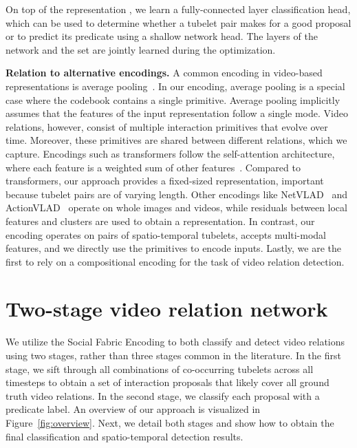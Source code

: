 \documentclass[10pt,twocolumn,letterpaper]{article}
\begin{document}
On top of the representation , we learn a fully-connected layer classification head, which can be used to determine whether a tubelet pair makes for a good proposal or to predict its predicate using a shallow network head. The layers of the network and the set  are jointly learned during the optimization. 

\textbf{Relation to alternative encodings.}
A common encoding in video-based representations is average pooling~\cite{yue2015beyond}. In our encoding, average pooling is a special case where the codebook contains a single primitive. Average pooling implicitly assumes that the features of the input representation follow a single mode. Video relations, however, consist of multiple interaction primitives that evolve over time. Moreover, these primitives are shared between different relations, which we capture.
Encodings such as transformers follow the self-attention architecture, where each feature is a weighted sum of other features~\cite{vaswani2017attention}. Compared to transformers, our approach provides a fixed-sized representation, important because tubelet pairs are of varying length. Other encodings like NetVLAD~\cite{arandjelovic2016netvlad} and ActionVLAD~\cite{girdhar2017actionvlad}   operate on whole images and videos, while residuals between local features and clusters are used to obtain a representation. In contrast, our encoding operates on pairs of spatio-temporal tubelets, accepts multi-modal features, and we directly use the primitives to encode inputs. Lastly, we are the first to rely on a compositional encoding for the task of video relation detection.

\section{Two-stage video relation network}
We utilize the Social Fabric Encoding to both classify and detect video relations using two stages, rather than three stages common in the literature. In the first stage, we sift through all combinations of co-occurring tubelets across all timesteps to obtain a set of interaction proposals that likely cover all ground truth video relations. In the second stage, we classify each proposal with a predicate label. An overview of our approach is visualized in Figure~\ref{fig:overview}. Next, we detail both stages and show how to obtain the final classification and spatio-temporal detection results.
\end{document}
